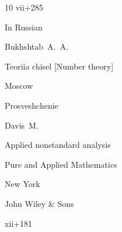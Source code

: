 \begin{thebibliography}{10}
\totalpages vii+285 





\lang In Russian

\by Bukhshtab~A.~A.

\book  Teoriia chisel \rm [Number theory]

\publaddr Moscow

\publ Prosveshchenie








\by Davis~M.

\book Applied nonstandard analysis


\serial Pure and Applied Mathematics

\publaddr New York 

\publ John Wiley \& Sons

\totalpages xii+181 






\end{thebibliography}



%

